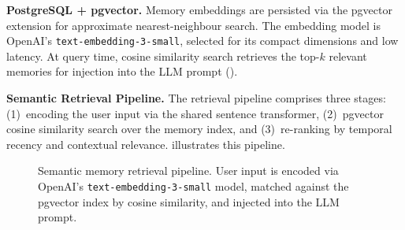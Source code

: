 \textbf{PostgreSQL + pgvector.} Memory embeddings are persisted via the pgvector extension for approximate nearest-neighbour search. The embedding model is OpenAI's \texttt{text-embedding-3-small}, selected for its compact dimensions and low latency. At query time, cosine similarity search retrieves the top-$k$ relevant memories for injection into the LLM prompt ().

\textbf{Semantic Retrieval Pipeline.} The retrieval pipeline comprises three stages: (1)~encoding the user input via the shared sentence transformer, (2)~pgvector cosine similarity search over the memory index, and (3)~re-ranking by temporal recency and contextual relevance.  illustrates this pipeline.


\begin{figure}[htbp]
  \centering
  \caption{Semantic memory retrieval pipeline. User input is encoded via OpenAI's \texttt{text-embedding-3-small} model, matched against the pgvector index by cosine similarity, and injected into the LLM prompt.}
  \label{fig:memory_pipeline}
\end{figure}



